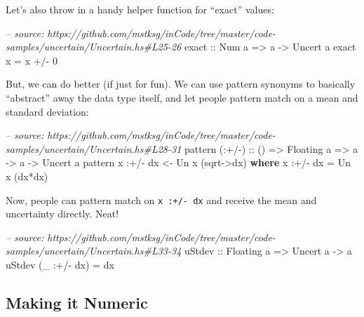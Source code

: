 \documentclass[]{article}
\newenvironment{Shaded}{}{}
\newcommand{\KeywordTok}[1]{\textcolor[rgb]{0.00,0.44,0.13}{\textbf{{#1}}}}
\newcommand{\DataTypeTok}[1]{\textcolor[rgb]{0.56,0.13,0.00}{{#1}}}
\newcommand{\DecValTok}[1]{\textcolor[rgb]{0.25,0.63,0.44}{{#1}}}
\newcommand{\CommentTok}[1]{\textcolor[rgb]{0.38,0.63,0.69}{\textit{{#1}}}}
\newcommand{\OtherTok}[1]{\textcolor[rgb]{0.00,0.44,0.13}{{#1}}}
\newcommand{\FunctionTok}[1]{\textcolor[rgb]{0.02,0.16,0.49}{{#1}}}
\newcommand{\NormalTok}[1]{{#1}}
\begin{document}
Let's also throw in a handy helper function for ``exact'' values:

\begin{Shaded}
\begin{Highlighting}[]
\CommentTok{-- source: https://github.com/mstksg/inCode/tree/master/code-samples/uncertain/Uncertain.hs#L25-26}
\OtherTok{exact ::} \DataTypeTok{Num} \NormalTok{a }\OtherTok{=>} \NormalTok{a }\OtherTok{->} \DataTypeTok{Uncert} \NormalTok{a}
\NormalTok{exact x }\FunctionTok{=} \NormalTok{x }\FunctionTok{+/-} \DecValTok{0}
\end{Highlighting}
\end{Shaded}

But, we can do better (if just for fun). We can use pattern synonyms to
basically ``abstract'' away the data type itself, and let people pattern
match on a mean and standard deviation:

\begin{Shaded}
\begin{Highlighting}[]
\CommentTok{-- source: https://github.com/mstksg/inCode/tree/master/code-samples/uncertain/Uncertain.hs#L28-31}
\NormalTok{pattern}\OtherTok{ (:+/-) ::} \NormalTok{() }\OtherTok{=>} \DataTypeTok{Floating} \NormalTok{a }\OtherTok{=>} \NormalTok{a }\OtherTok{->} \NormalTok{a }\OtherTok{->} \DataTypeTok{Uncert} \NormalTok{a}
\NormalTok{pattern x }\FunctionTok{:+/-} \NormalTok{dx }\OtherTok{<-} \DataTypeTok{Un} \NormalTok{x (sqrt}\OtherTok{->}\NormalTok{dx)}
  \KeywordTok{where}
    \NormalTok{x }\FunctionTok{:+/-} \NormalTok{dx }\FunctionTok{=} \DataTypeTok{Un} \NormalTok{x (dx}\FunctionTok{*}\NormalTok{dx)}
\end{Highlighting}
\end{Shaded}

Now, people can pattern match on \texttt{x\ :+/-\ dx} and receive the
mean and uncertainty directly. Neat!

\begin{Shaded}
\begin{Highlighting}[]
\CommentTok{-- source: https://github.com/mstksg/inCode/tree/master/code-samples/uncertain/Uncertain.hs#L33-34}
\OtherTok{uStdev ::} \DataTypeTok{Floating} \NormalTok{a }\OtherTok{=>} \DataTypeTok{Uncert} \NormalTok{a }\OtherTok{->} \NormalTok{a}
\NormalTok{uStdev (_ }\FunctionTok{:+/-} \NormalTok{dx) }\FunctionTok{=} \NormalTok{dx}
\end{Highlighting}
\end{Shaded}

\subsection{Making it Numeric}\label{making-it-numeric}
\end{document}

